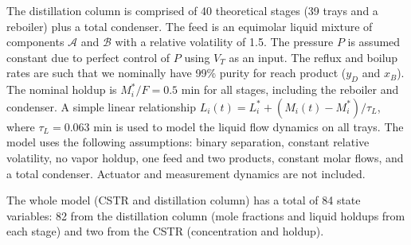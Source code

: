 The distillation column is comprised of 40 theoretical stages (39 trays and a reboiler) plus a total condenser.
The feed is an equimolar liquid mixture of components $\mathcal{A}$ and $\mathcal{B}$ with a relative volatility of 1.5.
The pressure $P$ is assumed constant due to perfect control of $P$ using $V_T$ as an input.
The reflux and boilup rates are such that we nominally have 99\% purity for reach product ($y_D$ and $x_B$).
The nominal holdup is $M_i^*/F=0.5$ \si{\minute} for all stages, including the reboiler and condenser.
A simple linear relationship $L_i(t)=L_i^*+(M_i(t)-M_i^*)/\tau_L$, where $\tau_L=0.063$ \si{\minute} is used to model the liquid flow dynamics on all trays.
The model uses the following assumptions: binary separation, constant relative volatility, no vapor holdup, one feed and two products, constant molar flows, and a total condenser.
Actuator and measurement dynamics are not included.
\par
The whole model (CSTR and distillation column) has a total of 84 state variables: 82 from the distillation column (mole fractions and liquid holdups from each stage) and two from the CSTR (concentration and holdup).
